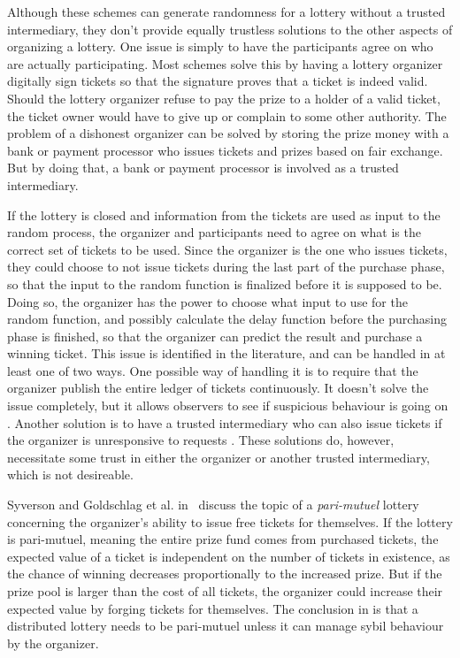 Although these schemes can generate randomness for a lottery without a trusted intermediary, they don't provide equally trustless solutions to the other aspects of organizing a lottery. One issue is simply to have the participants agree on who are actually participating. Most schemes solve this by having a lottery organizer digitally sign tickets so that the signature proves that a ticket is indeed valid. Should the lottery organizer refuse to pay the prize to a holder of a valid ticket, the ticket owner would have to give up or complain to some other authority. The problem of a dishonest organizer can be solved by storing the prize money with a bank or payment processor who issues tickets and prizes based on fair exchange. But by doing that, a bank or payment processor is involved as a trusted intermediary. 

If the lottery is closed and information from the tickets are used as input to the random process, the organizer and participants need to agree on what is the correct set of tickets to be used. Since the organizer is the one who issues tickets, they could choose to not issue tickets during the last part of the purchase phase, so that the input to the random function is finalized before it is supposed to be. Doing so, the organizer has the power to choose what input to use for the random function, and possibly calculate the delay function before the purchasing phase is finished, so that the organizer can predict the result and purchase a winning ticket. This issue is identified in the literature, and can be handled in at least one of two ways. One possible way of handling it is to require that the organizer publish the entire ledger of tickets continuously. It doesn't solve the issue completely, but it allows observers to see if suspicious behaviour is going on \cite{syverson_weakly_1998}. Another solution is to have a trusted intermediary who can also issue tickets if the organizer is unresponsive to requests \cite{zhou_playing_2001}. These solutions do, however, necessitate some trust in either the organizer or another trusted intermediary, which is not desireable.

Syverson and Goldschlag et al. in~\cite{syverson_weakly_1998,goldschlag_temporarily_2010} discuss the topic of a \emph{pari-mutuel} lottery concerning the organizer's ability to issue free tickets for themselves. If the lottery is pari-mutuel, meaning the entire prize fund comes from purchased tickets, the expected value of a ticket is independent on the number of tickets in existence, as the chance of winning decreases proportionally to the increased prize. But if the prize pool is larger than the cost of all tickets, the organizer could increase their expected value by forging tickets for themselves. The conclusion in \cite{syverson_weakly_1998, goldschlag_temporarily_2010} is that a distributed lottery needs to be pari-mutuel unless it can manage sybil behaviour by the organizer.

